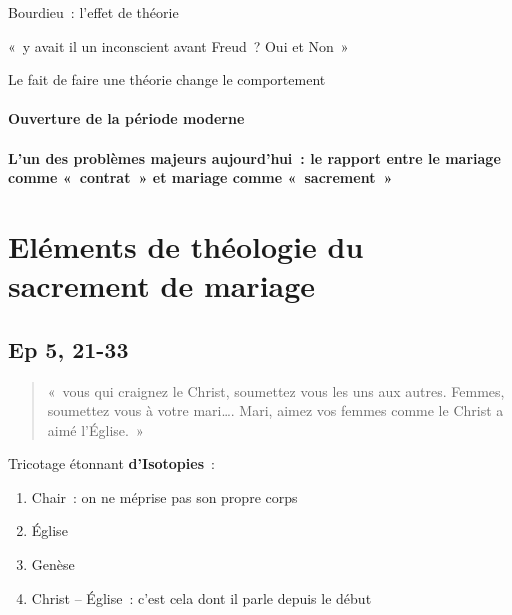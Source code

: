 Bourdieu~: l'effet de théorie

«~y avait il un inconscient avant Freud~? Oui et Non~»

Le fait de faire une théorie change le comportement

\hypertarget{b.-ouverture-de-la-puxe9riode-moderne}{%
\paragraph{Ouverture de la période
moderne}\label{b.-ouverture-de-la-puxe9riode-moderne}}

\hypertarget{c.-lun-des-probluxe8mes-majeurs-aujourdhui-le-rapport-entre-le-mariage-comme-contrat-et-mariage-comme-sacrement}{%
\paragraph{L'un des problèmes majeurs aujourd'hui~: le rapport
entre le mariage comme «~contrat~» et mariage comme
«~sacrement~»}\label{c.-lun-des-probluxe8mes-majeurs-aujourdhui-le-rapport-entre-le-mariage-comme-contrat-et-mariage-comme-sacrement}}

\hypertarget{eluxe9ments-de-thuxe9ologie-du-sacrement-de-mariage}{%
\section{Eléments de théologie du sacrement de
mariage}\label{eluxe9ments-de-thuxe9ologie-du-sacrement-de-mariage}}

\hypertarget{ep-5-21-33}{%
\subsection{Ep 5, 21-33}\label{ep-5-21-33}}
\begin{quote}
    «~vous qui craignez le Christ, soumettez vous les uns aux autres.
Femmes, soumettez vous à votre mari\ldots. Mari, aimez vos femmes comme
le Christ a aimé l'Église.~»
\end{quote}


Tricotage étonnant \textbf{d'Isotopies}~:

\begin{enumerate}

\item
  Chair~: on ne méprise pas son propre corps
\item
  Église
\item
  Genèse
\item
  Christ -- Église~: c'est cela dont il parle depuis le début
\end{enumerate}

